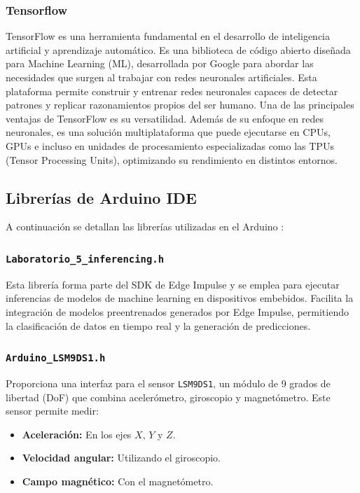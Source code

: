 \documentclass[12pt,a4paper]{article}
\begin{document}
\subsubsection{Tensorflow}
TensorFlow es una herramienta fundamental en el desarrollo de inteligencia artificial y aprendizaje automático. Es una biblioteca de código abierto diseñada para Machine Learning (ML), desarrollada por Google para abordar las necesidades que surgen al trabajar con redes neuronales artificiales. Esta plataforma permite construir y entrenar redes neuronales capaces de detectar patrones y replicar razonamientos propios del ser humano. Una de las principales ventajas de TensorFlow es su versatilidad. Además de su enfoque en redes neuronales, es una solución multiplataforma que puede ejecutarse en CPUs, GPUs e incluso en unidades de procesamiento especializadas como las TPUs (Tensor Processing Units), optimizando su rendimiento en distintos entornos. \cite{tensorflow}



\subsection{Librerías de Arduino IDE}
A continuación se detallan las librerías utilizadas en el Arduino \cite{lib}:


\subsubsection{\texttt{Laboratorio\_5\_inferencing.h}}
Esta librería forma parte del SDK de Edge Impulse y se emplea para ejecutar inferencias de modelos de machine learning en dispositivos embebidos. Facilita la integración de modelos preentrenados generados por Edge Impulse, permitiendo la clasificación de datos en tiempo real y la generación de predicciones.

\subsubsection{\texttt{Arduino\_LSM9DS1.h}}
Proporciona una interfaz para el sensor \texttt{LSM9DS1}, un módulo de 9 grados de libertad (DoF) que combina acelerómetro, giroscopio y magnetómetro. Este sensor permite medir:
\begin{itemize}
    \item \textbf{Aceleración:} En los ejes $X$, $Y$ y $Z$.
    \item \textbf{Velocidad angular:} Utilizando el giroscopio.
    \item \textbf{Campo magnético:} Con el magnetómetro.
\end{itemize}
\end{document}
